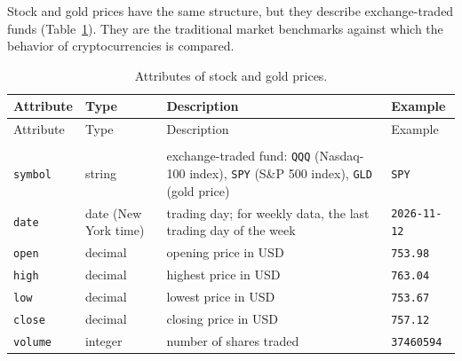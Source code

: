 \documentclass[
]{article}
\begin{document}
Stock and gold prices have the same structure, but they describe exchange-traded funds (Table~\ref{tbl-market}). They are the traditional market benchmarks against which the behavior of cryptocurrencies is compared.

\begin{longtable}[]{@{}
  >{\raggedright\arraybackslash}p{}
  >{\raggedright\arraybackslash}p{}
  >{\raggedright\arraybackslash}p{}
  >{\raggedright\arraybackslash}p{}@{}}
\toprule\noalign{}
\begin{minipage}[b]{\linewidth}\raggedright
Attribute
\end{minipage} & \begin{minipage}[b]{\linewidth}\raggedright
Type
\end{minipage} & \begin{minipage}[b]{\linewidth}\raggedright
Description
\end{minipage} & \begin{minipage}[b]{\linewidth}\raggedright
Example
\end{minipage} \\
\midrule\noalign{}
\endfirsthead
\toprule\noalign{}
\begin{minipage}[b]{\linewidth}\raggedright
Attribute
\end{minipage} & \begin{minipage}[b]{\linewidth}\raggedright
Type
\end{minipage} & \begin{minipage}[b]{\linewidth}\raggedright
Description
\end{minipage} & \begin{minipage}[b]{\linewidth}\raggedright
Example
\end{minipage} \\
\midrule\noalign{}
\endhead
\bottomrule\noalign{}
\caption{Attributes of stock and gold prices.}\label{tbl-market}\tabularnewline
\endlastfoot
\texttt{symbol} & string & exchange-traded fund: \texttt{QQQ} (Nasdaq-100 index), \texttt{SPY} (S\&P 500 index), \texttt{GLD} (gold price) & \texttt{SPY} \\
\midrule\noalign{}
\texttt{date} & date (New York time) & trading day; for weekly data, the last trading day of the week & \texttt{2026-\allowbreak{}11-\allowbreak{}12} \\
\midrule\noalign{}
\texttt{open} & decimal & opening price in USD & \texttt{753.\allowbreak{}98} \\
\midrule\noalign{}
\texttt{high} & decimal & highest price in USD & \texttt{763.\allowbreak{}04} \\
\midrule\noalign{}
\texttt{low} & decimal & lowest price in USD & \texttt{753.\allowbreak{}67} \\
\midrule\noalign{}
\texttt{close} & decimal & closing price in USD & \texttt{757.\allowbreak{}12} \\
\midrule\noalign{}
\texttt{volume} & integer & number of shares traded & \texttt{37460594} \\
\end{longtable}
\end{document}
